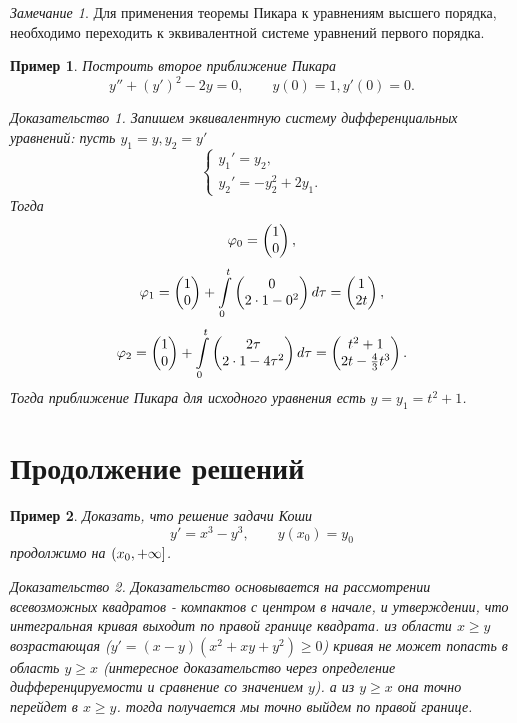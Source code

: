 \documentclass[a5paper, 11pt]{article}
\theoremstyle{definition}
\theoremstyle{plain}
\newtheorem{Ex}{Пример}
\theoremstyle{remark}
\newtheorem*{Note}{Замечание}
\newtheorem*{Proof}{Доказательство}
\begin{document}
	\begin{Note}
		Для применения теоремы Пикара к уравнениям высшего порядка, необходимо переходить к эквивалентной системе уравнений первого порядка.
	\end{Note}
	\begin{Ex}
		Построить второе приближение Пикара
		\[
		y'' + (y')^2 - 2y = 0, \qquad y(0) = 1, y'(0) = 0.
		\]
		\begin{Proof}
			Запишем эквивалентную систему дифференциальных уравнений: пусть $y_1 = y, y_2 = y'$
			\[
			\begin{cases}
				y_1' = y_2,\\
				y_2' = -y_2^2 +2y_1.
			\end{cases}
			\]
			Тогда 
			\[
			\varphi_0 = \begin{pmatrix}1\\0\end{pmatrix},
			\]
			\[
			\varphi_1 = \begin{pmatrix}1\\0\end{pmatrix} + \int\limits_0^t \begin{pmatrix}0\\2\cdot 1-0^2\end{pmatrix}d\tau = \begin{pmatrix}1\\2t\end{pmatrix},
			\]
			\[
			\varphi_2 = \begin{pmatrix}1\\0\end{pmatrix} + \int\limits_0^t \begin{pmatrix}2\tau\\2\cdot1 - 4\tau^2\end{pmatrix} d\tau = \begin{pmatrix}t^2+1\\2t-\frac43 t^3\end{pmatrix}.
			\]
			Тогда приближение Пикара для исходного уравнения есть $y=y_1 = t^2+1$.
		\end{Proof}
	\end{Ex}
	\section[09.12.2022]{Продолжение решений}
	\begin{Ex}
		Доказать, что решение задачи Коши 
		\[
		y' = x^3-y^3, \qquad y(x_0) = y_0
		\]
		продолжимо на $\left(x_0, +\infty\right]$. 
		\begin{Proof}
			Доказательство основывается на рассмотрении всевозможных квадратов - компактов с центром в начале, и утверждении, что интегральная кривая выходит по правой границе квадрата.  из области $x\geqslant y$ возрастающая ($y'=(x-y)(x^2+xy+y^2)\geqslant 0$) кривая не может попасть в область $y\geqslant x$ (интересное доказательство через  определение дифференцируемости и сравнение со значением $y$). а из $y\geqslant x$ она точно перейдет в $x\geqslant y$. тогда получается мы точно выйдем по правой границе.
		\end{Proof} 
	\end{Ex}
\end{document}
